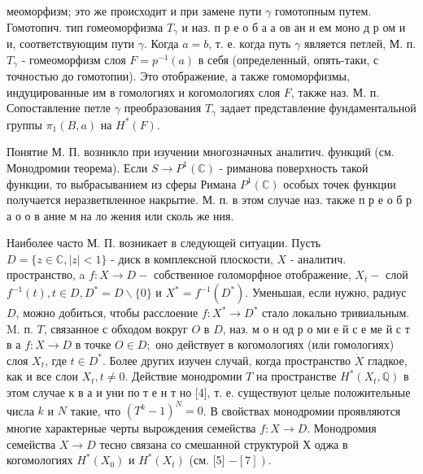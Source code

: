 \documentclass[10pt]{article}
\begin{document}
меоморфизм; это же происходит и при замене пути $\gamma$ гомотопным путем. Гомотопич. тип гомеоморфизма $T_{\gamma}$ и наз. п р е о б а а ов ан и ем моно д р ом и и, соответствующим пути $\gamma$. Когда $a=b$, т. е. когда путь $\gamma$ является петлей, М. п. $T_{\gamma}$ - гомеоморфизм слоя $F=p^{-1}(a)$ в себя (определенный, опять-таки, с точностью до гомотопии). Это отображение, а также гомоморфизмы, индуцированные им в гомологиях и когомологиях слоя $F$, также наз. М. п. Сопоставление петле $\gamma$ преобразования $T_{\gamma}$ задает представление фундаментальной группы $\pi_{1}(B, a)$ на $H^{*}(F)$.



Понятие М. П. возникло при изучении многозначных аналитич. функций (см. Монодромии теорема). Если $S \rightarrow P^{1}(\mathbb{C})$ - риманова поверхность такой функции, то выбрасыванием из сферы Римана $P^{1}(\mathbb{C})$ особых точек функции получается неразветвленное накрытие. М. п. в этом случае наз. также п р е о б р а $о$ о в ание м на ло жения или сколь же ния.



Наиболее часто М. П. возникает в следующей ситуации. Пусть $D=\{z \in \mathbb{C},|z|<1\}$ - диск в комплексной плоскости, $X$ - аналитич. пространство, a $f: X \rightarrow D-$ собственное голоморфное отображение, $X_{t}-$ слой $f^{-1}(t), t \in D, D^{*}=D \backslash\{0\}$ и $X^{*}=f^{-1}\left(D^{*}\right)$. Уменьшая, если нужно, радиус $D$, можно добиться, чтобы расслоение $f: X^{*} \rightarrow D^{*}$ стало локально тривиальным. M. п. $T$, связанное с обходом вокруг $O$ в $D$, наз. м о н од р о ми е й с е ме й с т в а $f: X \rightarrow D$ в точке $O \in D ;$ оно действует в когомологиях (или гомологиях) слоя $X_{t}$, где $t \in D^{*}$. Более других изучен случай, когда пространство $\dot{X}$ гладкое, как и все слои $X_{t}, t \neq 0$. Действие монодромии $T$ на пространстве $H^{*}\left(X_{t}, \mathbb{Q}\right)$ в этом случае к в а и уни по т е н т но [4], т. е. существуют целые положительные числа $k$ и $N$ такие, что $\left(T^{k}-1\right)^{N}=0$. В свойствах монодромии проявляются многие характерные черты вырождения семейства $f: X \rightarrow D$. Монодромия семейства $X \rightarrow D$ тесно связана со смешанной структурой Х оджа в когомологиях $H^{*}\left(X_{0}\right)$ и $H^{*}\left(X_{t}\right)$ (см. [5] $\left.-[7]\right)$.
\end{document}
